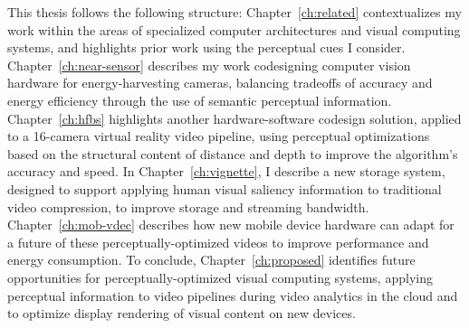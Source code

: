 This thesis follows the following structure:
Chapter~\ref{ch:related} contextualizes my work within the areas of specialized computer architectures and visual computing systems, and highlights prior work using the perceptual cues I consider.
Chapter~\ref{ch:near-sensor} describes my work codesigning computer vision hardware for energy-harvesting cameras, balancing tradeoffs of accuracy and energy efficiency through the use of semantic perceptual information.
Chapter~\ref{ch:hfbs} highlights another hardware-software codesign solution, applied to a 16-camera virtual reality video pipeline, using perceptual optimizations based on the structural content of distance and depth to improve the algorithm's accuracy and speed.
In Chapter~\ref{ch:vignette}, I describe a new storage system, designed to support applying human visual saliency information to traditional video compression, to improve storage and streaming bandwidth.
Chapter~\ref{ch:mob-vdec} describes how new mobile device hardware can adapt for a future of these perceptually-optimized videos to improve performance and energy consumption.
To conclude, Chapter~\ref{ch:proposed} identifies future opportunities for perceptually-optimized visual computing systems, applying perceptual information to video pipelines during video analytics in the cloud and to optimize display rendering of visual content on new devices.


